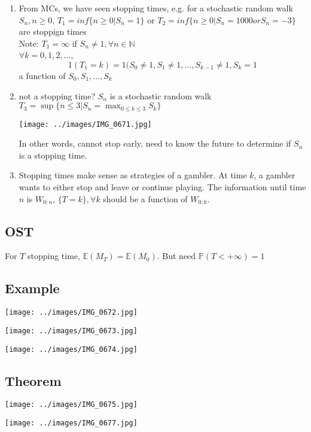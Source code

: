 \documentclass{article}
\begin{document}
\begin{enumerate} 
    \item From MCs, we have seen stopping times, e.g. for a
stochastic random walk $S_n, n\geq 0$, $T_1 = inf\{n\geq 0 | S_n = 1\}$ or $T_2
= inf\{n\geq 0 | S_n = 1000 or S_n = -3\}$ are stoppign times \\
Note: $T_1 = \infty$ if $S_n \neq 1, \forall n \in \mathbb{N}$ \\
$\forall k = 0, 1, 2, ...$, $$1(T_1=k) = 1(S_0 \neq 1, S_1\neq 1, ..., S_{k-1}\neq 1, S_k =1$$ a function of $S_0, S_1, ..., S_k$ \\
\item not a stopping time? $S_n$ is a stochastic random walk $T_3 = \sup\{n\leq 3 | S_n  =\max_{0\leq k \leq 3} S_k\}$

    \texttt{[image: ../images/IMG\_0671.jpg]}

    In other words, cannot stop early, need to know the future to determine if $S_n$ is a stopping time.
\item Stopping times make sense as strategies of a gambler. At time $k$, a gambler wants to either stop and leave or continue playing.
    The information until time $n$ is $W_{0:n}$, $\{T=k\}, \forall k$ should be a function of $W_{0:k}$.

\end{enumerate}

\subsection*{OST}
For $T$ stopping time, $\mathbb{E}(M_T)= \mathbb{E}(M_0)$. But need $\mathbb{P}(T < +\infty)=1$

\subsection*{Example}

    \texttt{[image: ../images/IMG\_0672.jpg]}

    \texttt{[image: ../images/IMG\_0673.jpg]}
            
    \texttt{[image: ../images/IMG\_0674.jpg]}

\subsection*{Theorem}

\texttt{[image: ../images/IMG\_0675.jpg]}

\texttt{[image: ../images/IMG\_0677.jpg]}


    
\end{document}
